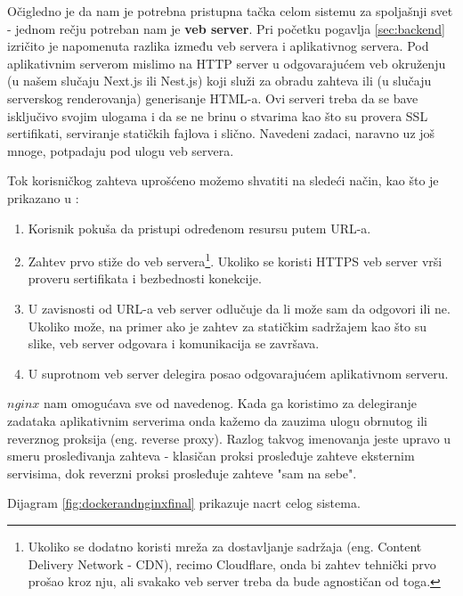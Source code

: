 \documentclass[12pt,oneside]{memoir}
\begin{document}
Očigledno je da nam je potrebna pristupna tačka celom sistemu za spoljašnji svet - jednom rečju potreban nam je \textbf{veb server}. Pri početku pogavlja \ref{sec:backend} izričito je napomenuta razlika između veb servera i aplikativnog servera. Pod aplikativnim serverom mislimo na HTTP server u odgovarajućem veb okruženju (u našem slučaju Next.js ili Nest.js) koji služi za obradu zahteva ili (u slučaju serverskog renderovanja) generisanje HTML-a. Ovi serveri treba da se bave isključivo svojim ulogama i da se ne brinu o stvarima kao što su provera SSL sertifikati, serviranje statičkih fajlova i slično. Navedeni zadaci, naravno uz još mnoge, potpadaju pod ulogu veb servera.

Tok korisničkog zahteva uprošćeno možemo shvatiti na sledeći način, kao što je prikazano u \cite{webvsappserver}:
\begin{enumerate}
    \item Korisnik pokuša da pristupi određenom resursu putem URL-a.
    \item Zahtev prvo stiže do veb servera\footnote{Ukoliko se dodatno koristi mreža za dostavljanje sadržaja (eng. Content Delivery Network - CDN), recimo Cloudflare, onda bi zahtev tehnički prvo prošao kroz nju, ali svakako veb server treba da bude agnostičan od toga.}. Ukoliko se koristi HTTPS veb server vrši proveru sertifikata i bezbednosti konekcije.
    \item U zavisnosti od URL-a veb server odlučuje da li može sam da odgovori ili ne. Ukoliko može, na primer ako je zahtev za statičkim sadržajem kao što su slike, veb server odgovara i komunikacija se završava.
    \item U suprotnom veb server delegira posao odgovarajućem aplikativnom serveru.
\end{enumerate}

$nginx$ \cite{nginxdocs} nam omogućava sve od navedenog. Kada ga koristimo za delegiranje zadataka aplikativnim serverima onda kažemo da zauzima ulogu obrnutog ili reverznog proksija (eng. reverse proxy). Razlog takvog imenovanja jeste upravo u smeru prosleđivanja zahteva - klasičan proksi prosleđuje zahteve eksternim servisima, dok reverzni proksi prosleđuje zahteve "sam na sebe". 

Dijagram \ref{fig:dockerandnginxfinal} prikazuje nacrt celog sistema.
\end{document}
